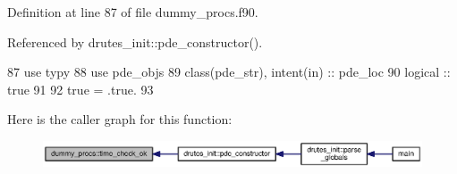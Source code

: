 Definition at line 87 of file dummy\+\_\+procs.\+f90.



Referenced by drutes\+\_\+init\+::pde\+\_\+constructor().


\begin{DoxyCode}
87       \textcolor{keywordtype}{use }typy
88       \textcolor{keywordtype}{use }pde_objs
89       \textcolor{keywordtype}{class}(pde_str), \textcolor{keywordtype}{intent(in)} :: pde\_loc
90       \textcolor{keywordtype}{logical} :: true
91             
92       true = .true.
93       
\end{DoxyCode}


Here is the caller graph for this function\+:\nopagebreak
\begin{figure}[H]
\begin{center}
\leavevmode
\includegraphics[width=350pt]{namespacedummy__procs_ac922ec374fd9a8a429df19713f52568d_icgraph}
\end{center}
\end{figure}


